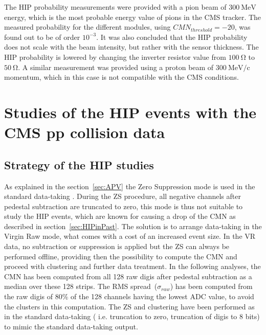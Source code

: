 The HIP probability measurements were provided with a pion beam of $300~\mathrm{MeV}$ energy, which is the most probable energy value of pions in the CMS tracker. The measured probability for the different modules, using $CMN_{threshold}=-20$, was found out to be of order $10^{-3}$. It was also concluded that the HIP probability does not scale with the beam intensity, but rather with the sensor thickness. The HIP probability is lowered by changing the inverter resistor value from $100~\mathrm{\Omega}$ to  $50~\mathrm{\Omega}$. A similar measurement was provided using a proton beam of  $300~\mathrm{MeV/c}$ momentum, which in this case is not compatible with the CMS conditions.


\section{Studies of the HIP events with the CMS pp collision data}

\subsection{Strategy of the HIP studies}

As explained in the section~\ref{sec:APV} the Zero Suppression mode is used in the standard data-taking . During the ZS procedure, all negative channels after pedestal subtraction are truncated to zero, this mode is thus not suitable to study the HIP events, which are known for causing a drop of the CMN as described in section~\ref{sec:HIPinPast}. The solution is to arrange data-taking in the Virgin Raw mode, what comes with a cost of an increased event size. In the VR data, no subtraction or suppression is applied but the ZS can always be performed offline, providing then the possibility to compute the CMN and proceed with clustering and further data treatment. In the following analyses, the CMN has been computed from all 128 raw digis after pedestal subtraction as a median over these 128 strips. The RMS spread~($\sigma_{raw}$) has been computed from the raw digis of 80\% of the 128 channels having the lowest ADC value, to avoid the clusters in this computation. The ZS and clustering have been performed as in the standard data-taking ( i.e. truncation to zero, truncation of digis to 8 bits) to mimic the standard data-taking output.

